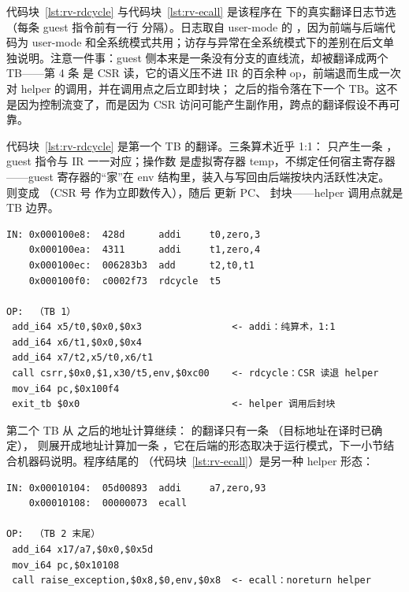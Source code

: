 代码块~\ref{lst:rv-rdcycle} 与代码块~\ref{lst:rv-ecall} 是该程序在  下的真实翻译日志节选（每条 guest 指令前有一行 \code{----} 分隔）。日志取自 user-mode 的 ，因为前端与后端代码为 user-mode 和全系统模式共用；访存与异常在全系统模式下的差别在后文单独说明。注意一件事：guest 侧本来是一条没有分支的直线流，却被翻译成两个 TB——第 4 条  是 CSR 读，它的语义压不进 IR 的百余种 op，前端退而生成一次对 helper 的调用，并在调用点之后立即封块； 之后的指令落在下一个 TB。这不是因为控制流变了，而是因为 CSR 访问可能产生副作用，跨点的翻译假设不再可靠。

代码块~\ref{lst:rv-rdcycle} 是第一个 TB 的翻译。三条算术近乎 1:1： 只产生一条 ，guest 指令与 IR 一一对应；操作数  是虚拟寄存器 temp，不绑定任何宿主寄存器——guest 寄存器的“家”在 env 结构里，装入与写回由后端按块内活跃性决定。 则变成 （CSR 号  作为立即数传入），随后  更新 PC、 封块——helper 调用点就是 TB 边界。

\begin{lstlisting}[caption={TB 1：rdcycle 退化为 helper 调用并在调用点封块（qemu-riscv64 -d in\_asm,op 输出节选）},label={lst:rv-rdcycle}]
IN: 0x000100e8:  428d      addi     t0,zero,3
    0x000100ea:  4311      addi     t1,zero,4
    0x000100ec:  006283b3  add      t2,t0,t1
    0x000100f0:  c0002f73  rdcycle  t5

OP:  （TB 1）
 add_i64 x5/t0,$0x0,$0x3                <- addi：纯算术，1:1
 add_i64 x6/t1,$0x0,$0x4
 add_i64 x7/t2,x5/t0,x6/t1
 call csrr,$0x0,$1,x30/t5,env,$0xc00    <- rdcycle：CSR 读退 helper
 mov_i64 pc,$0x100f4
 exit_tb $0x0                           <- helper 调用后封块
\end{lstlisting}

第二个 TB 从  之后的地址计算继续： 的翻译只有一条 （目标地址在译时已确定）， 则展开成地址计算加一条 ，它在后端的形态取决于运行模式，下一小节结合机器码说明。程序结尾的 （代码块~\ref{lst:rv-ecall}）是另一种 helper 形态：

\begin{lstlisting}[caption={TB 2 末尾：ecall 退化为 noreturn helper（qemu-riscv64 -d in\_asm,op 输出节选）},label={lst:rv-ecall}]
IN: 0x00010104:  05d00893  addi     a7,zero,93
    0x00010108:  00000073  ecall

OP:  （TB 2 末尾）
 add_i64 x17/a7,$0x0,$0x5d
 mov_i64 pc,$0x10108
 call raise_exception,$0x8,$0,env,$0x8  <- ecall：noreturn helper
\end{lstlisting}

